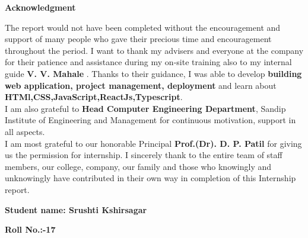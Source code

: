 
\begin{center}

\large{\textbf{Acknowledgment}}
\end{center}

The  report would not have been completed without the encouragement and support of many people who gave their precious time and encouragement throughout the period. I want to thank my advisers and everyone at the company for their patience and assistance during my on-site training also to my internal guide \textbf{V. V. Mahale} . Thanks to their guidance, I was able to develop \textbf{building web application, project management, deployment} and learn about \textbf{HTMl,CSS,JavaScript,ReactJs,Typescript}.\\

 I am also grateful to \textbf{Head Computer Engineering Department}, Sandip Institute of Engineering and Management  for  continuous motivation, support in all aspects.\\


I am most grateful to our honorable Principal \textbf{Prof.(Dr). D. P. Patil} for giving us the permission for internship. I sincerely thank to the entire team of staff members, our college, company,  our family and those who knowingly and unknowingly have contributed in their own way in completion of this Internship report.

\vspace{0.2in}
\hspace{3in}
\textbf{Student name: Srushti Kshirsagar}

\hspace{3.2in}\textbf{Roll No.:-17 }

